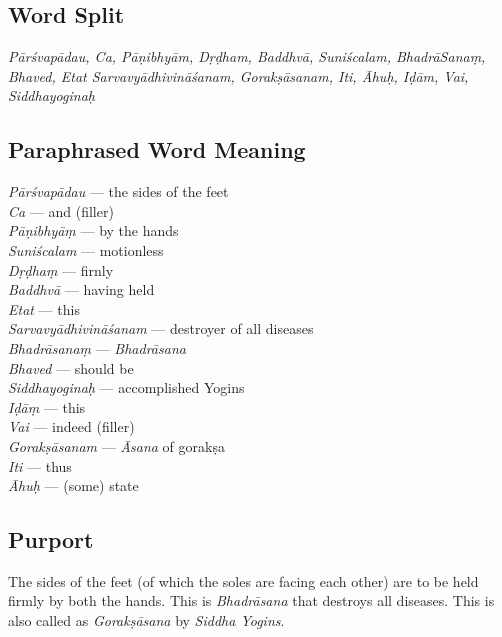 \subsection*{Word Split}

\textit{Pārśvapādau, Ca, Pāṇibhyām, Dṛḍham, Baddhvā, Suniścalam, Bhadrā\-Sanaṃ, Bhaved, Etat Sarvavyādhivināśanam, Gorakṣāsanam, Iti, Āhuḥ, Iḍām, Vai, Siddhayoginaḥ}

\vspace{-10pt}

\subsection*{Paraphrased Word Meaning}
\vspace{-10pt}

\begin{multicols}{2}
\textit{Pārśvapādau} ---  the sides of the feet  \\
\textit{Ca} ---  and (filler) \\
\textit{Pāṇibhyāṃ} ---  by the hands  \\
\textit{Suniścalam} --- motionless  \\
\textit{Dṛḍhaṃ} ---  firnly \\
\textit{Baddhvā} --- having held  \\
\textit{Etat} ---  this  \\
\textit{Sarvavyādhivināśanam} --- destroyer of all diseases  \\
\textit{Bhadrāsanaṃ} --- \textit{Bhadrāsana} \\
\textit{Bhaved} --- should be \\
\textit{Siddhayoginaḥ} ---  accomplished Yogins \\
\textit{Iḍāṃ} ---  this  \\
\textit{Vai} ---  indeed (filler) \\
\textit{Gorakṣāsanam} ---  \textit{Āsana} of gorakṣa \\
\textit{Iti} --- thus  \\
\textit{Āhuḥ}  --- (some) state
\end{multicols}
\vspace{-10pt}

\subsection*{Purport}

The sides of the feet (of which the soles are facing each other) are to be held firmly by both the hands. This is \textit{Bhadrāsana} that destroys all diseases. This is also called as \textit{Gorakṣāsana} by \textit{Siddha Yogins}.
\vspace{-10pt}


